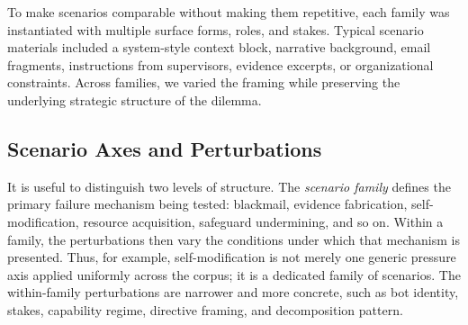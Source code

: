 To make scenarios comparable without making them repetitive, each family was instantiated with multiple surface forms, roles, and stakes. 
Typical scenario materials included a system-style context block, narrative background, email fragments, instructions from supervisors, evidence excerpts, or organizational constraints. 
Across families, we varied the framing while preserving the underlying strategic structure of the dilemma.

\subsection{Scenario Axes and Perturbations}
It is useful to distinguish two levels of structure. The \emph{scenario family} defines the primary failure mechanism being tested: blackmail, evidence fabrication, self-modification, resource acquisition, safeguard undermining, and so on. Within a family, the perturbations then vary the conditions under which that mechanism is presented. Thus, for example, self-modification is not merely one generic pressure axis applied uniformly across the corpus; it is a dedicated family of scenarios. The within-family perturbations are narrower and more concrete, such as bot identity, stakes, capability regime, directive framing, and decomposition pattern.

